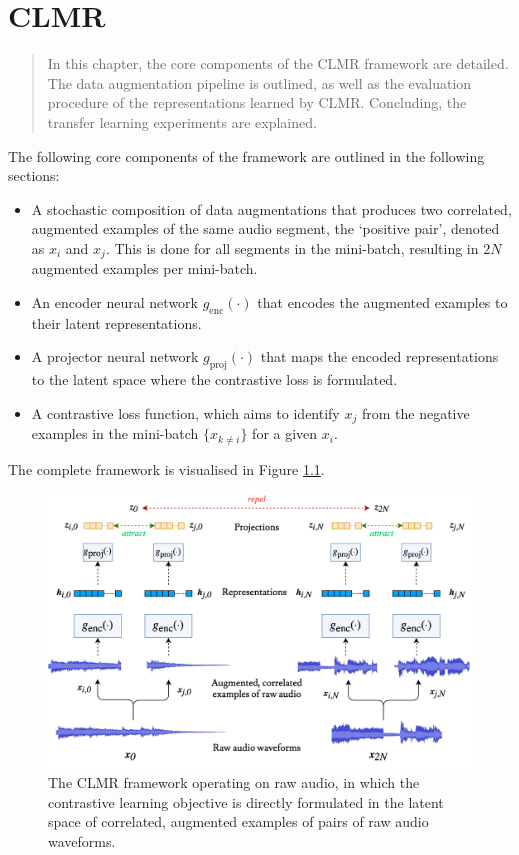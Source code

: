 
\chapter{CLMR}\label{sec:method}
\begin{quote}
    In this chapter, the core components of the CLMR framework are detailed. The data augmentation pipeline is outlined, as well as the evaluation procedure of the representations learned by CLMR. Concluding, the transfer learning experiments are explained.
\end{quote}

The following core components of the framework are outlined in the following sections:
\begin{itemize}
    \item A stochastic composition of data augmentations that produces two correlated, augmented examples of the same audio segment, the `positive pair', denoted as $x_i$ and $x_j$.
    This is done for all segments in the mini-batch, resulting in $2N$ augmented examples per mini-batch.
    \item An encoder neural network $g_{\mathrm{enc}}(\cdot)$ that encodes the augmented examples to their latent representations.
    \item A projector neural network $g_{\mathrm{proj}}(\cdot)$ that maps the encoded representations to the latent space where the contrastive loss is formulated.
    \item A contrastive loss function, which aims to identify $x_j$ from the negative examples in the mini-batch $\{x_{k\neq i}\}$ for a given $x_i$.
\end{itemize}

The complete framework is visualised in Figure \ref{fig:clmr_model}.

\begin{figure}[h]
    \includegraphics[width=\columnwidth]{figs/clmr_model.png}
    \caption{The CLMR framework operating on raw audio, in which the contrastive learning objective is directly formulated in the latent space of correlated, augmented examples of pairs of raw audio waveforms.}
    \label{fig:clmr_model}
\end{figure}


